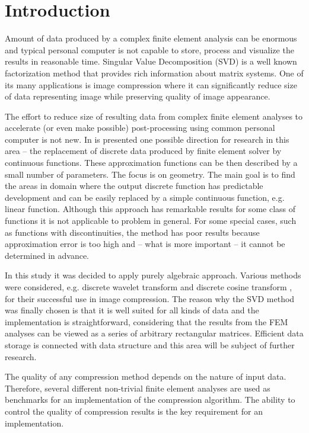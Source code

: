 \section{Introduction}
\label{sec:introduction}


Amount of data produced by a complex finite element analysis can be enormous and typical personal computer is not capable to store, process and visualize the results in reasonable time. Singular Value Decomposition (SVD) is a well known factorization method that provides rich information about matrix systems. One of its many applications is image compression where it can significantly reduce size of data representing image while preserving quality of image appearance.

The effort to reduce size of resulting data from complex finite element analyses to accelerate (or even make possible) post-processing using common personal computer is not new. In \cite{Benes2016} is presented one possible direction for research in this area -- the replacement of discrete data produced by finite element solver by continuous functions. These approximation functions can be then described by a small number of parameters. The focus is on geometry. The main goal is to find the areas in domain where the output discrete function has predictable development and can be easily replaced by a simple continuous function, e.g. linear function. Although this approach has remarkable results for some class of functions it is not applicable to problem in general. For some special cases, such as functions with discontinuities, the method has poor results because approximation error is too high and -- what is more important -- it cannot be determined in advance.

In this study it was decided to apply purely algebraic approach. Various methods were considered, e.g. discrete wavelet transform \cite{Lui2001} and discrete cosine transform \cite{Watson1994}, for their successful use in image compression. The reason why the SVD method was finally chosen is that it is well suited for all kinds of data and the implementation is straightforward, considering that the results from the FEM analyses can be viewed as a series of arbitrary rectangular matrices. Efficient data storage is connected with data structure \cite{Ivanyi2012, Ivanyi2014} and this area will be subject of further research.

The quality of any compression method depends on the nature of input data. Therefore, several different non-trivial finite element analyses are used as benchmarks for an implementation of the compression algorithm. The ability to control the quality of compression results is the key requirement for an implementation.

